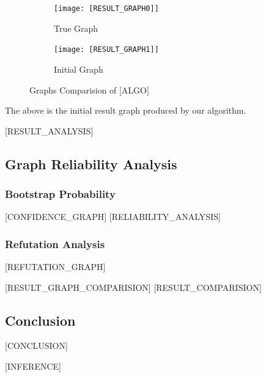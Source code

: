 \documentclass{article}
\begin{document}
\begin{figure}[H]
    \centering
    \begin{subfigure}{0.45\textwidth}
        \centering
        \vspace{-0.5cm}
        \texttt{[image: [RESULT\_GRAPH0]]}
        \vfill
        \caption{True Graph}
        \label{fig:sub1}
    \end{subfigure}
    \hspace{0.04\textwidth}
    \begin{subfigure}{0.45\textwidth}
        \centering
        \vspace{-0.5cm}
        \texttt{[image: [RESULT\_GRAPH1]]}
        \vfill
        \caption{Initial Graph}
        \label{fig:sub2}
    \end{subfigure}
    \label{fig:main}
    \caption{Graphs Comparision of [ALGO]}
\end{figure}

The above is the initial result graph produced by our algorithm.

[RESULT_ANALYSIS]

\subsection{Graph Reliability Analysis}

\subsubsection{Bootstrap Probability}
[CONFIDENCE_GRAPH]
[RELIABILITY_ANALYSIS]

\subsubsection{Refutation Analysis}
[REFUTATION_GRAPH]

[RESULT_GRAPH_COMPARISION]
[RESULT_COMPARISION]

\subsection{Conclusion}
[CONCLUSION]

[INFERENCE]
\end{document}
